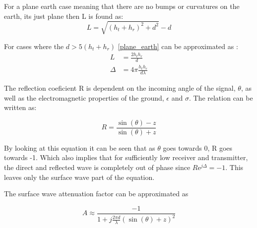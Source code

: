 For a plane earth case meaning that there are no bumps or curvatures on the earth, its just plane then L is found as:
\begin{equation}
L=\sqrt{(h_t+h_r)^2+d^2}-d
\label{plane_earth}
\end{equation}
\begin{where}
\end{where}

For cases where the $d > 5(h_t+h_r)$ \autoref{plane_earth} can be approximated as \citep{Bullington}:
\begin{align}
L &=\frac{2h_th_r}{d} \\
\Delta &= 4\pi\frac{h_th_r}{d\lambda}
\end{align}

The reflection coeficient R is dependent on the incoming angle of the signal, $\theta$, as well as the electromagnetic properties of the ground, $\epsilon$ and $\sigma$. The relation can be written as\citep{Bullington}:

\begin{equation}
R=\frac{\sin(\theta)-z}{\sin(\theta)+z}
\end{equation}
\begin{where}
\end{where}

By looking at this equation it can be seen that as $\theta$ goes towards 0, R goes towards -1. Which also implies that for sufficiently low receiver and transmitter, the direct and reflected wave is completely out of phase since $R\text{e}^{j\Delta} = -1$. This leaves only the surface wave part of the equation.

The surface wave attenuation factor can be approximated as\citep{Bullington}

\begin{equation}
A\approx\frac{-1}{1+j\frac{2\pi d}{\lambda}\left(\sin(\theta)+z\right)^2}
\end{equation}

